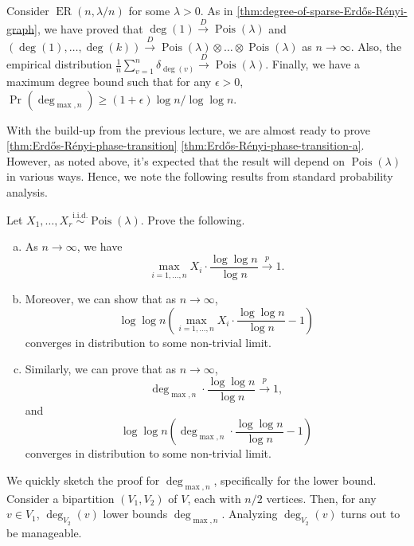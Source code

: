 \begin{prev}
	Consider \(\operatorname{ER}(n, \lambda / n) \) for some \(\lambda > 0\). As in \autoref{thm:degree-of-sparse-Erdős-Rényi-graph}, we have proved that \(\deg (1) \overset{D}{\to} \operatorname{Pois}(\lambda ) \) and \((\deg (1), \dots , \deg (k)) \overset{D}{\to} \operatorname{Pois}(\lambda ) \otimes \dots \otimes \operatorname{Pois}(\lambda ) \) as \(n \to \infty \). Also, the empirical distribution \(\frac{1}{n}\sum_{v=1}^{n} \delta _{\deg (v)} \overset{D}{\to} \operatorname{Pois}(\lambda ) \). Finally, we have a maximum degree bound such that for any \(\epsilon > 0\), \(\Pr_{}(\deg _{\max , n}) \geq (1 + \epsilon ) \log n / \log \log n \).
\end{prev}

With the build-up from the previous lecture, we are almost ready to prove \autoref{thm:Erdős-Rényi-phase-transition} \autoref{thm:Erdős-Rényi-phase-transition-a}. However, as noted above, it's expected that the result will depend on \(\operatorname{Pois}(\lambda ) \) in various ways. Hence, we note the following results from standard probability analysis.

\begin{exercise}
	Let \(X_1, \dots , X_r \overset{\text{i.i.d.} }{\sim } \operatorname{Pois}(\lambda ) \). Prove the following.
	\begin{enumerate}[(a)]
		\item As \(n \to \infty \), we have
		      \[
			      \max _{i = 1, \dots , n} X_i \cdot \frac{\log \log n}{\log n}
			      \overset{p}{\to} 1.
		      \]
		\item Moreover, we can show that as \(n \to \infty \),
		      \[
			      \log \log n \left( \max _{i = 1, \dots , n} X_i \cdot \frac{\log \log n}{\log n} - 1 \right)
		      \]
		      converges in distribution to some non-trivial limit.
		\item Similarly, we can prove that as \(n \to \infty \),
		      \[
			      \deg _{\max , n} \cdot \frac{\log \log n}{\log n}
			      \overset{p}{\to} 1,
		      \]
		      and
		      \[
			      \log \log n \left( \deg _{\max , n} \cdot \frac{\log \log n}{\log n} - 1\right)
		      \]
		      converges in distribution to some non-trivial limit.
	\end{enumerate}
\end{exercise}
\begin{answer}
	We quickly sketch the proof for \(\deg _{\max , n}\), specifically for the lower bound. Consider a bipartition \((V_1, V_2)\) of \(V\), each with \(n / 2\) vertices. Then, for any \(v \in V_1\), \(\deg _{V_2}(v)\) lower bounds \(\deg _{\max , n}\). Analyzing \(\deg _{V_2}(v)\) turns out to be manageable.
\end{answer}

